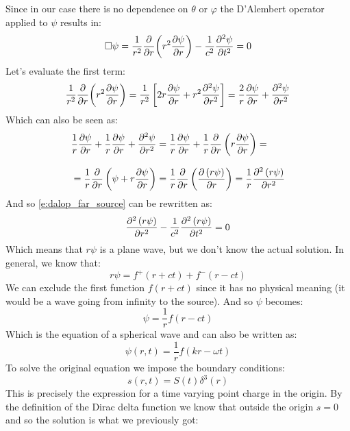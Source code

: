 Since in our case there is no dependence on $\theta$ or $\varphi$ the D'Alembert operator applied to $\psi$ results in:
\begin{equation} \label{e:dalop_far_source}
  \dalop \psi = \dfrac{1}{r^2} \pdv{}{r}\bbrackets{r^2 \pdv{\psi}{r}} - \dfrac{1}{c^2} \pdv[2]{\psi}{t} = 0
\end{equation}
Let's evaluate the first term:
\begin{equation}
  \dfrac{1}{r^2} \pdv{}{r}\bbrackets{r^2 \pdv{\psi}{r}} = \dfrac{1}{r^2} \sqbr{2r \pdv{\psi}{r} + r^2 \pdv[2]{\psi}{r}} = \dfrac{2}{r} \pdv{\psi}{r} + \pdv[2]{\psi}{r}
\end{equation}
Which can also be seen as:
\begin{equation}
  \begin{split}
    &\dfrac{1}{r} \pdv{\psi}{r} + \dfrac{1}{r} \pdv{\psi}{r} + \pdv[2]{\psi}{r} = \dfrac{1}{r} \pdv{\psi}{r} + \dfrac{1}{r}\pdv{}{r}\brackets{r\pdv{\psi}{r}} = \\[8pt]
    &= \dfrac{1}{r} \pdv{}{r}\brackets{\psi + r\pdv{\psi}{r}} = \dfrac{1}{r}\pdv{}{r}\brackets{\pdv{\brackets{r\psi}}{r}} = \dfrac{1}{r}\pdv[2]{\brackets{r\psi}}{r}
  \end{split}
\end{equation}
And so \eqref{e:dalop_far_source} can be rewritten as:
\begin{equation}
  \pdv[2]{\brackets{r\psi}}{r} - \dfrac{1}{c^2} \pdv[2]{\brackets{r\psi}}{t} = 0
\end{equation}
Which means that $r\psi$ is a plane wave, but we don't know the actual solution. In general, we know that:
\begin{equation}
  r\psi = f^+(r+ct) + f^-(r-ct)
\end{equation}
We can exclude the first function $f(r+ct)$ since it has no physical meaning (it would be a wave going from infinity to the source). And so $\psi$ becomes:
\begin{equation}
  \psi = \dfrac{1}{r} f(r-ct)
\end{equation}
Which is the equation of a spherical wave and can also be written as:
\begin{equation}
  \boxed{\psi(r,t) = \dfrac{1}{r} f(kr - \omega t)}
\end{equation}
To solve the original equation we impose the boundary conditions:
\begin{equation}
  s(r,t) = S(t)\delta^3(r)
\end{equation}
This is precisely the expression for a time varying point charge in the origin. By the definition of the Dirac delta function we know that outside the origin $s=0$ and so the solution is what we previously got:
